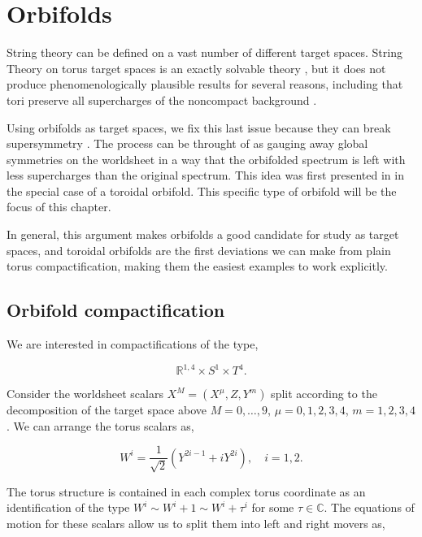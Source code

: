 \chapter{Orbifolds}
\label{chap:orbifold}
\pagestyle{fancy}

String theory can be defined on a vast number of different target spaces. String Theory on torus target spaces is an exactly solvable theory \cite{GREEN1983437}, but it does not produce phenomenologically plausible results for several reasons, including that tori preserve all supercharges of the noncompact background \cite{GrañaTriendl}.

Using orbifolds as target spaces, we fix this last issue because they can break supersymmetry \cite{Giaccari_2023}. The process can be throught of as gauging away global symmetries on the worldsheet in a way that the orbifolded spectrum is left with less supercharges than the original spectrum. This idea was first presented in \cite{DIXON1985678} in the special case of a toroidal orbifold. This specific type of orbifold will be the focus of this chapter.

In general, this argument makes orbifolds a good candidate for study as target spaces, and toroidal orbifolds are the first deviations we can make from plain torus compactification, making them the easiest examples to work explicitly.

\section{Orbifold compactification}

We are interested in compactifications of the type,

\begin{equation}
    \mathbb{R}^{1,4} \times S^1 \times T^4.
\end{equation}

Consider the worldsheet scalars $X^M = (X^\mu, Z, Y^m)$ split according to the decomposition of the target space above $M = 0,\dots,9$, $\mu = 0,1,2,3,4$, $m = 1,2,3,4$. We can arrange the torus scalars as,

\begin{equation}
    \label{eq:4_complex_torus}
    W^i=\frac1{\sqrt{2}}(Y^{2i-1}+iY^{2i}),\quad i=1,2.
\end{equation}

The torus structure is contained in each complex torus coordinate as an identification of the type $W^i \sim W^i + 1 \sim W^i + \tau^i$ for some $\tau \in \mathbb{C}$. The equations of motion for these scalars allow us to split them into left and right movers as,

